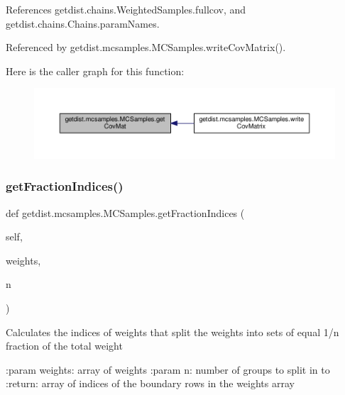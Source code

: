 References getdist.\+chains.\+Weighted\+Samples.\+fullcov, and getdist.\+chains.\+Chains.\+param\+Names.



Referenced by getdist.\+mcsamples.\+M\+C\+Samples.\+write\+Cov\+Matrix().

Here is the caller graph for this function\+:
\nopagebreak
\begin{figure}[H]
\begin{center}
\leavevmode
\includegraphics[width=350pt]{classgetdist_1_1mcsamples_1_1MCSamples_a2b52bd7f0fb69759e1170cec6b336c75_icgraph}
\end{center}
\end{figure}
\mbox{\label{classgetdist_1_1mcsamples_1_1MCSamples_a74ef903cb27895eefe585592947b1c1a}} 
\subsubsection{\texorpdfstring{get\+Fraction\+Indices()}{getFractionIndices()}}
{\footnotesize\ttfamily def getdist.\+mcsamples.\+M\+C\+Samples.\+get\+Fraction\+Indices (\begin{DoxyParamCaption}\item[{}]{self,  }\item[{}]{weights,  }\item[{}]{n }\end{DoxyParamCaption})}

\begin{DoxyVerb}Calculates the indices of weights that split the weights into sets of equal 1/n fraction of the total weight

:param weights: array of weights
:param n: number of groups to split in to
:return: array of indices of the boundary rows in the weights array
\end{DoxyVerb}
 

